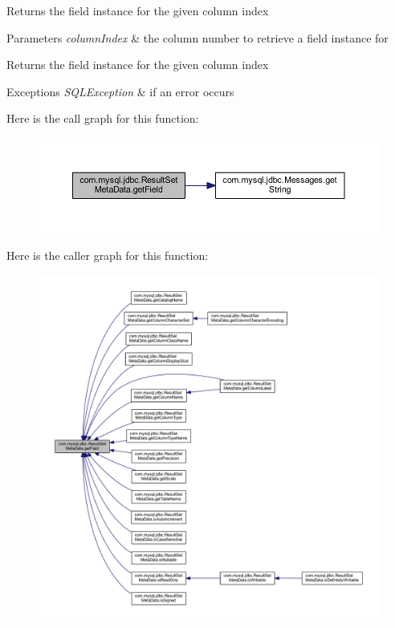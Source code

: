 Returns the field instance for the given column index


\begin{DoxyParams}{Parameters}
{\em column\+Index} & the column number to retrieve a field instance for\\
\hline
\end{DoxyParams}
\begin{DoxyReturn}{Returns}
the field instance for the given column index
\end{DoxyReturn}

\begin{DoxyExceptions}{Exceptions}
{\em S\+Q\+L\+Exception} & if an error occurs \\
\hline
\end{DoxyExceptions}
Here is the call graph for this function\+:
\nopagebreak
\begin{figure}[H]
\begin{center}
\leavevmode
\includegraphics[width=350pt]{classcom_1_1mysql_1_1jdbc_1_1_result_set_meta_data_a5aa9a71bdb9452f61329796a7748988d_cgraph}
\end{center}
\end{figure}
Here is the caller graph for this function\+:
\nopagebreak
\begin{figure}[H]
\begin{center}
\leavevmode
\includegraphics[width=350pt]{classcom_1_1mysql_1_1jdbc_1_1_result_set_meta_data_a5aa9a71bdb9452f61329796a7748988d_icgraph}
\end{center}
\end{figure}
